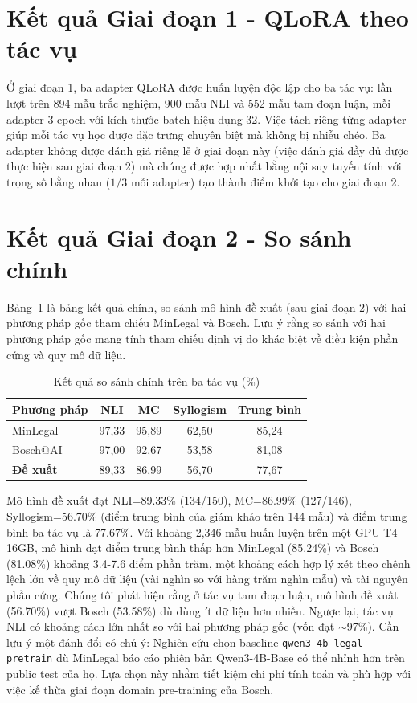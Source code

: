 \section{Kết quả Giai đoạn 1 - QLoRA theo tác vụ}

Ở giai đoạn 1, ba adapter QLoRA được huấn luyện độc lập cho ba tác vụ: lần lượt trên 894 mẫu trắc nghiệm, 900 mẫu NLI và 552 mẫu tam đoạn luận, mỗi adapter 3 epoch với kích thước batch hiệu dụng 32. Việc tách riêng từng adapter giúp mỗi tác vụ học được đặc trưng chuyên biệt mà không bị nhiễu chéo. Ba adapter không được đánh giá riêng lẻ ở giai đoạn này (việc đánh giá đầy đủ được thực hiện sau giai đoạn 2) mà chúng được hợp nhất bằng nội suy tuyến tính với trọng số bằng nhau ($1/3$ mỗi adapter) tạo thành điểm khởi tạo cho giai đoạn 2.

\section{Kết quả Giai đoạn 2 - So sánh chính}

Bảng~\ref{tab:main} là bảng kết quả chính, so sánh mô hình đề xuất (sau giai đoạn 2) với hai phương pháp gốc tham chiếu MinLegal và Bosch. Lưu ý rằng so sánh với hai phương pháp gốc mang tính tham chiếu định vị do khác biệt về điều kiện phần cứng và quy mô dữ liệu.

\begin{table}[ht]
\centering
\begin{tabular}{lcccc}
\toprule
\textbf{Phương pháp} & \textbf{NLI} & \textbf{MC} & \textbf{Syllogism} & \textbf{Trung bình} \\
\midrule
MinLegal~\cite{luan2025minlegal} & 97,33 & 95,89 & 62,50 & 85,24 \\
Bosch@AI~\cite{quang2025bosch}   & 97,00 & 92,67 & 53,58 & 81,08 \\
\textbf{Đề xuất}                  & 89,33 & 86,99 & 56,70 & 77,67 \\
\bottomrule
\end{tabular}
\caption{Kết quả so sánh chính trên ba tác vụ (\%)}
\label{tab:main}
\end{table}

Mô hình đề xuất đạt NLI=89.33\% (134/150), MC=86.99\% (127/146), Syllogism=56.70\% (điểm trung bình của giám khảo trên 144 mẫu) và điểm trung bình ba tác vụ là 77.67\%. Với khoảng 2,346 mẫu huấn luyện trên một GPU T4 16GB, mô hình đạt điểm trung bình thấp hơn MinLegal (85.24\%) và Bosch (81.08\%) khoảng 3.4-7.6 điểm phần trăm, một khoảng cách hợp lý xét theo chênh lệch lớn về quy mô dữ liệu (vài nghìn so với hàng trăm nghìn mẫu) và tài nguyên phần cứng. Chúng tôi phát hiện rằng ở tác vụ tam đoạn luận, mô hình đề xuất (56.70\%) vượt Bosch (53.58\%) dù dùng ít dữ liệu hơn nhiều. Ngược lại, tác vụ NLI có khoảng cách lớn nhất so với hai phương pháp gốc (vốn đạt $\sim$97\%). Cần lưu ý một đánh đổi có chủ ý: Nghiên cứu chọn baseline \texttt{qwen3-4b-legal-pretrain} dù MinLegal báo cáo phiên bản Qwen3-4B-Base có thể nhỉnh hơn trên public test của họ. Lựa chọn này nhằm tiết kiệm chi phí tính toán và phù hợp với việc kế thừa giai đoạn domain pre-training của Bosch.

